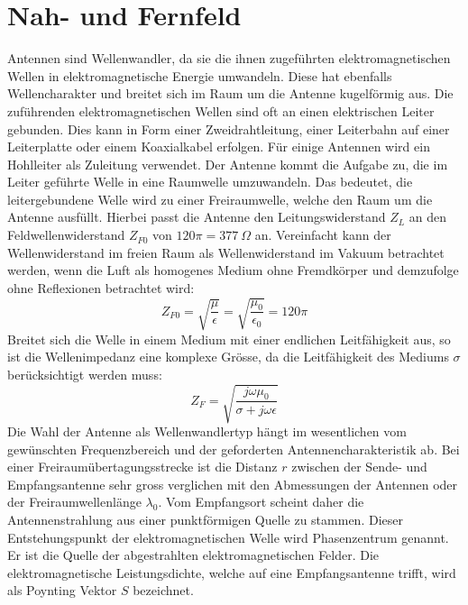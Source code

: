 \newpage
\section{Nah- und Fernfeld}\label{sec:NahundFern}
Antennen sind Wellenwandler, da sie die ihnen zugeführten elektromagnetischen Wellen in  elektromagnetische Energie umwandeln. Diese hat ebenfalls Wellencharakter und breitet sich im Raum um die Antenne kugelförmig aus. Die zuführenden elektromagnetischen Wellen sind oft an einen elektrischen Leiter gebunden. Dies kann in Form einer Zweidrahtleitung, einer Leiterbahn auf einer Leiterplatte oder einem Koaxialkabel erfolgen. Für einige Antennen wird ein Hohlleiter als Zuleitung verwendet. 
Der Antenne kommt die Aufgabe zu, die im Leiter geführte Welle in eine Raumwelle umzuwandeln. Das bedeutet, die leitergebundene Welle wird zu einer Freiraumwelle, welche den Raum um die Antenne ausfüllt.
Hierbei passt die Antenne den Leitungswiderstand $Z_{L}$ an den Feldwellenwiderstand $Z_{F0}$ von $120\pi = 377 \  \Omega$ an. Vereinfacht kann der Wellenwiderstand im freien Raum als Wellenwiderstand im Vakuum betrachtet werden, wenn die Luft als homogenes Medium ohne Fremdkörper und demzufolge ohne Reflexionen betrachtet wird:
\begin{equation}\label{eq:Wellenimpedanz}
Z_{F0}=\sqrt{\dfrac{\mu}{\epsilon}}=\sqrt{\dfrac{\mu_{0}}{\epsilon_{0}}}=120\pi
\end{equation}
Breitet sich die Welle in einem Medium mit einer endlichen Leitfähigkeit aus, so ist die Wellenimpedanz eine komplexe Grösse, da die Leitfähigkeit des Mediums $\sigma$ berücksichtigt werden muss:
\begin{equation}\label{eq:Wellenimpedanz_Leitung}
Z_{F}=\sqrt{\dfrac{j\omega\mu_{0}}{\sigma+j\omega\epsilon}}
\end{equation}
Die Wahl der Antenne als Wellenwandlertyp hängt im wesentlichen vom gewünschten Frequenzbereich und der geforderten Antennencharakteristik ab. Bei einer Freiraumübertagungsstrecke ist die Distanz $r$ zwischen der Sende- und Empfangsantenne sehr gross verglichen mit den Abmessungen der Antennen oder der Freiraumwellenlänge $\lambda_{0}$. Vom Empfangsort scheint daher die Antennenstrahlung aus einer punktförmigen Quelle zu stammen. Dieser Entstehungspunkt der elektromagnetischen Welle wird Phasenzentrum genannt. Er ist die Quelle der abgestrahlten elektromagnetischen Felder. Die elektromagnetische Leistungsdichte, welche auf eine Empfangsantenne trifft, wird als Poynting Vektor $S$ bezeichnet.\\
